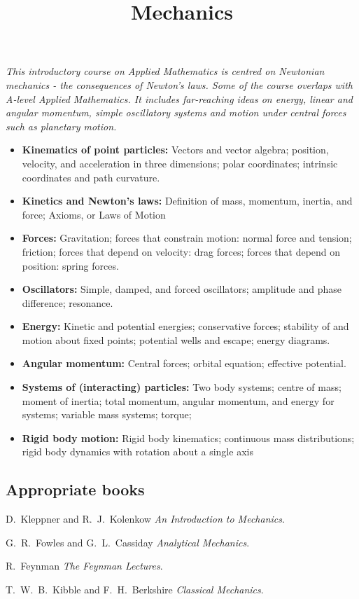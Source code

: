 \documentclass[twoside]{scrartcl}
\title{Mechanics}
\begin{document}
{
{\Large\bfseries{}}

\textit{This introductory course on Applied Mathematics is centred on Newtonian mechanics - the consequences of Newton’s laws. Some of the course overlaps with A-level Applied Mathematics. It includes far-reaching ideas on energy, linear and angular momentum, simple oscillatory systems and motion under central forces such as planetary motion.}

\begin{itemize}
\item \textbf{Kinematics of point particles:} Vectors and vector algebra; position, velocity, and acceleration in three dimensions; polar coordinates; intrinsic coordinates and path curvature.
\item \textbf{Kinetics and Newton's laws:} Definition of mass, momentum, inertia, and force; Axioms, or Laws of Motion
\item \textbf{Forces:} Gravitation; forces that constrain motion: normal force and tension; friction; forces that depend on velocity: drag forces; forces that depend on position: spring forces. 
\item \textbf{Oscillators:} Simple, damped, and forced oscillators; amplitude and phase difference; resonance.
\item \textbf{Energy:} Kinetic and potential energies; conservative forces; stability of and motion about fixed points; potential wells and escape; energy diagrams.
\item \textbf{Angular momentum:} Central forces; orbital equation; effective potential.
\item \textbf{Systems of (interacting) particles:} Two body systems; centre of mass; moment of inertia; total momentum, angular momentum, and energy for systems; variable mass systems; torque;
\item \textbf{Rigid body motion:} Rigid body kinematics; continuous mass distributions; rigid body dynamics with rotation about a single axis
\end{itemize}

\subsection*{Appropriate books}

{\shortskip
D.~Kleppner and R.~J.~Kolenkow \emph{An Introduction to Mechanics}.

G.~R.~Fowles and G.~L.~Cassiday \emph{Analytical Mechanics}.

R.~Feynman \emph{The Feynman Lectures}.

T.~W.~B.~Kibble and F.~H.~Berkshire \emph{Classical Mechanics}.

}}

\TableofContents

\end{document}
